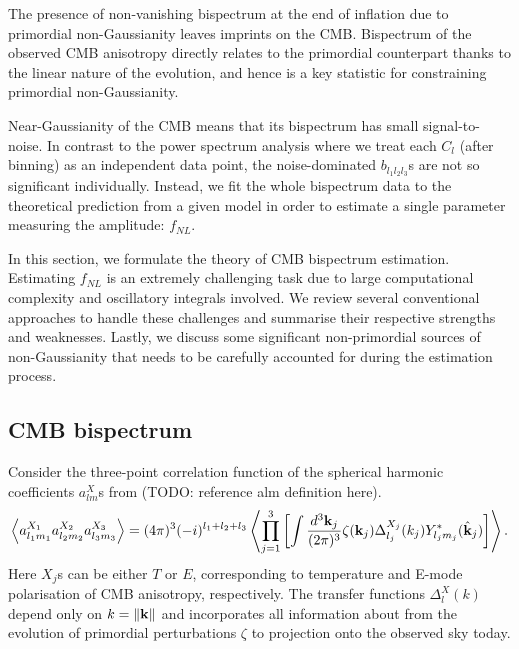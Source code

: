The presence of non-vanishing bispectrum at the end of inflation due to primordial non-Gaussianity leaves imprints on the CMB. Bispectrum of the observed CMB anisotropy directly relates to the primordial counterpart thanks to the linear nature of the evolution, and hence is a key statistic for constraining primordial non-Gaussianity.

Near-Gaussianity of the CMB means that its bispectrum has small signal-to-noise. In contrast to the power spectrum analysis where we treat each $C_l$ (after binning) as an independent data point, the noise-dominated $b_{l_1 l_2 l_3}$s are not so significant individually. Instead, we fit the whole bispectrum data to the theoretical prediction from a given model in order to estimate a single parameter measuring the amplitude: $f_{NL}$.

In this section, we formulate the theory of CMB bispectrum estimation. Estimating $f_{NL}$ is an extremely challenging task due to large computational complexity and oscillatory integrals involved. We review several conventional approaches to handle these challenges and summarise their respective strengths and weaknesses. Lastly, we discuss some significant non-primordial sources of non-Gaussianity that needs to be carefully accounted for during the estimation process.


\subsection{CMB bispectrum}

Consider the three-point correlation function of the spherical harmonic coefficients $a_{lm}^X$s from (TODO: reference alm definition here).
\begin{align}
	\left< a_{l_1 m_1}^{X_1} a_{l_2 m_2}^{X_2} a_{l_3 m_3}^{X_3}  \right> = (4\pi)^3 (-i)^{l_1 + l_2 + l_3} \left< \prod_{j=1}^{3} \left[ \int \frac{d^3\mathbf{k}_j}{(2\pi)^3} \zeta(\mathbf{k}_j)   \Delta_{l_j}^{X_j} (k_j) Y^*_{l_j m_j} (\hat{\mathbf{k}}_j) \right] \right>. \label{eqn:bispectrum_derivation_base_form}
\end{align}
Here $X_j$s can be either $T$ or $E$, corresponding to temperature and E-mode polarisation of CMB anisotropy, respectively. The transfer functions $\Delta_l^X (k)$ depend only on $k=\left\| \mathbf{k} \right\|$ and incorporates all information about from the evolution of primordial perturbations $\zeta$ to projection onto the observed sky today.

